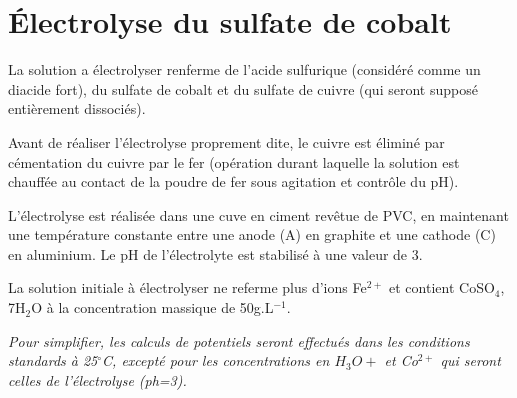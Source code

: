 \documentclass{report}
\begin{document}
\newpage

\section*{Électrolyse du sulfate de cobalt}

La solution a électrolyser renferme de l'acide sulfurique (considéré comme un diacide fort), du sulfate de cobalt et du sulfate de cuivre (qui seront supposé entièrement dissociés). 

Avant de réaliser l'électrolyse proprement dite, le cuivre est éliminé par cémentation du cuivre par le fer (opération durant laquelle la solution est chauffée au contact de la poudre de fer sous agitation et contrôle du pH).

L'électrolyse est réalisée dans une cuve en ciment revêtue de PVC, en maintenant une température constante entre une anode (A) en graphite et une cathode (C) en aluminium. Le pH de l'électrolyte est stabilisé à une valeur de 3.

La solution initiale à électrolyser ne referme plus d'ions Fe$^{2+}$  et contient CoSO$_4$, 7H$_2$O à la concentration massique de 50g.L$^{-1}$. 

\textit{Pour simplifier, les calculs de potentiels seront effectués dans les conditions standards à 25$^\circ$C, excepté pour les concentrations en $H_3O+$ et Co$^{2+}$ qui seront celles de l'électrolyse (ph=3).}
\end{document}
